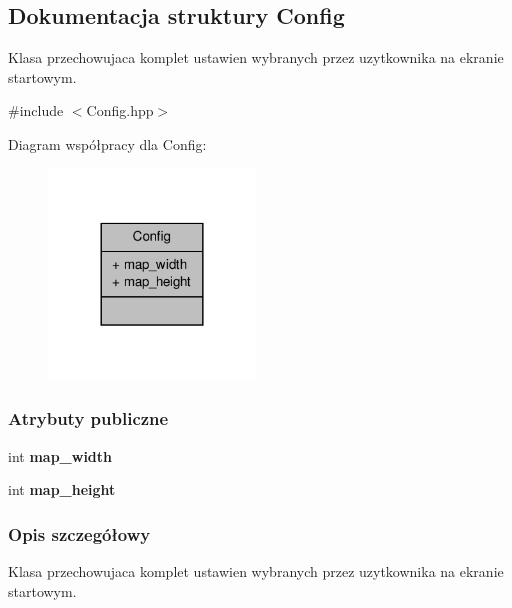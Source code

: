 \hypertarget{structConfig}{\subsection{Dokumentacja struktury Config}
\label{structConfig}
}


Klasa przechowujaca komplet ustawien wybranych przez uzytkownika na ekranie startowym.  




{\ttfamily \#include $<$Config.\-hpp$>$}



Diagram współpracy dla Config\-:
\nopagebreak
\begin{figure}[H]
\begin{center}
\leavevmode
\includegraphics[width=156pt]{structConfig__coll__graph}
\end{center}
\end{figure}
\subsubsection*{Atrybuty publiczne}
\begin{DoxyCompactItemize}
\item 
\hypertarget{structConfig_ac4596f9cbfcf2ab612ef32c4a6fbb21d}{int {\bfseries map\-\_\-width}}\label{structConfig_ac4596f9cbfcf2ab612ef32c4a6fbb21d}

\item 
\hypertarget{structConfig_a2ab1bfe7f4004dfb2082204638493b55}{int {\bfseries map\-\_\-height}}\label{structConfig_a2ab1bfe7f4004dfb2082204638493b55}

\end{DoxyCompactItemize}


\subsubsection{Opis szczegółowy}
Klasa przechowujaca komplet ustawien wybranych przez uzytkownika na ekranie startowym. 


